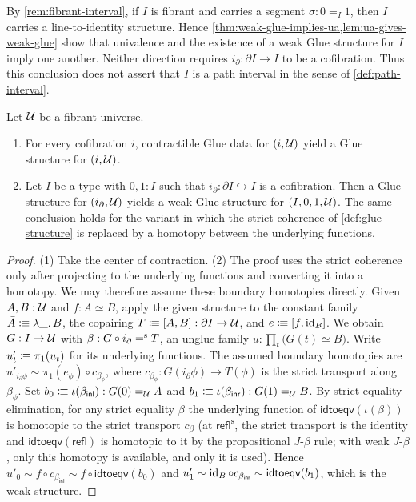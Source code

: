 By \cref{rem:fibrant-interval}, if \(I\) is fibrant and carries a segment
\(\sigma:0=_I1\), then \(I\) carries a line-to-identity structure. Hence
\cref{thm:weak-glue-implies-ua,lem:ua-gives-weak-glue} show that univalence
and the existence of a weak Glue structure for \(I\) imply one another.
Neither direction requires \(i_\partial:\partial I\to I\) to be a
cofibration. Thus this conclusion does not assert that \(I\) is a path
interval in the sense of \cref{def:path-interval}.

\begin{lemma}\label{lem:glue-strength-chain}
	Let $\mathcal{U}$ be a fibrant universe.
	\begin{enumerate}[noitemsep]
		\item For every cofibration $i$, contractible Glue data for
		$(i,\mathcal{U})$ yield a Glue structure for $(i,\mathcal{U})$.
		\item Let $I$ be a type with $0,1:I$ such that
		$i_\partial:\partial I\hookrightarrow I$ is a cofibration. Then
		a Glue structure for $(i_\partial,\mathcal{U})$ yields a weak Glue structure
		for $(I,0,1,\mathcal{U})$. The same conclusion holds for the variant in which
		the strict coherence of \cref{def:glue-structure} is replaced by a
		homotopy between the underlying functions.
	\end{enumerate}
\end{lemma}
\begin{proof}
	(1) Take the center of contraction. (2) The proof uses the strict
	coherence only after projecting to the underlying functions and converting
	it into a homotopy. We may therefore assume these boundary homotopies
	directly.
	Given $A,B:\mathcal{U}$ and $f:A\simeq B$, apply the given structure to the
	constant family $\bar A\mathrel{\vcentcolon\mspace{-1mu}\equiv}\lambda\_.\,B$, the
	copairing $T\mathrel{\vcentcolon\mspace{-1mu}\equiv}[A,B]:\partial I\to\mathcal{U}$, and
	$e\mathrel{\vcentcolon\mspace{-1mu}\equiv}[f,\operatorname{id}_B]$. We obtain $G:I\to\mathcal{U}$ with
	$\beta:G\circ i_\partial\mathrel{=^\textup{s}} T$, an unglue family
	$u:\prod_t\bigl(G(t)\simeq B\bigr)$. Write $u'_t\mathrel{\vcentcolon\mspace{-1mu}\equiv}\pi_1(u_t)$
	for its underlying functions. The assumed boundary homotopies are
	$u'_{i_\partial\phi}\sim\pi_1(e_\phi)\circ c_{\beta_\phi}$, where
	$c_{\beta_\phi}:G(i_\partial\phi)\to T(\phi)$ is the strict transport along
	$\beta_\phi$. Set $b_0\mathrel{\vcentcolon\mspace{-1mu}\equiv}\iota(\beta_{\mathsf{inl}}):G(0)=_{\mathcal{U}} A$
	and $b_1\mathrel{\vcentcolon\mspace{-1mu}\equiv}\iota(\beta_{\mathsf{inr}}):G(1)=_{\mathcal{U}} B$. By strict equality elimination, for
	any strict equality $\beta$ the underlying function of
	$\mathsf{idtoeqv}(\iota(\beta))$ is homotopic to the strict transport $c_\beta$ (at
	$\mathsf{refl}^{\mathrm{s}}$, the strict transport is the identity and
	$\mathsf{idtoeqv}(\mathsf{refl})$ is homotopic to it by the propositional
	$J$-$\beta$ rule; with weak $J$-$\beta$, only this homotopy is available, and
	only it is used). Hence
	$u'_0 \sim f\circ c_{\beta_{\mathsf{inl}}} \sim f\circ\mathsf{idtoeqv}(b_0)$
	and
	$u'_1 \sim \operatorname{id}_B\circ c_{\beta_{\mathsf{inr}}} \sim \mathsf{idtoeqv}(b_1)$,
	which is the weak structure.
\end{proof}


